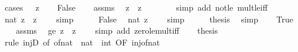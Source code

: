 \begin{isabellebody}
%
\isadelimproof
%
\endisadelimproof
%
\isatagproof
{}\isamarkupfalse%
\ {\isacharparenleft}{\kern0pt}cases\ {\isachardoublequoteopen}{}\ {\isasymle}\ z{\isacharprime}{\kern0pt}{\isachardoublequoteclose}{\isacharparenright}{\kern0pt}\isanewline
\ \ \isamarkupfalse%
\ False\isanewline
\ \ \isamarkupfalse%
\ assms\ \isamarkupfalse%
\ {\isachardoublequoteopen}z\ {\isacharasterisk}{\kern0pt}\ z{\isacharprime}{\kern0pt}\ {\isasymle}\ {}{\isachardoublequoteclose}\isanewline
\ \ \ \ \isamarkupfalse%
\ {\isacharparenleft}{\kern0pt}simp\ add{\isacharcolon}{\kern0pt}\ not{\isacharunderscore}{\kern0pt}le\ mult{\isacharunderscore}{\kern0pt}le{\isacharunderscore}{\kern0pt}{}{\isacharunderscore}{\kern0pt}iff{\isacharparenright}{\kern0pt}\isanewline
\ \ \isamarkupfalse%
\ \isamarkupfalse%
\ {\isachardoublequoteopen}nat\ {\isacharparenleft}{\kern0pt}z\ {\isacharasterisk}{\kern0pt}\ z{\isacharprime}{\kern0pt}{\isacharparenright}{\kern0pt}\ {\isacharequal}{\kern0pt}\ {}{\isachardoublequoteclose}\ \isamarkupfalse%
\ simp\isanewline
\ \ \isamarkupfalse%
\ \isamarkupfalse%
\ False\ \isamarkupfalse%
\ {\isachardoublequoteopen}nat\ z{\isacharprime}{\kern0pt}\ {\isacharequal}{\kern0pt}\ {}{\isachardoublequoteclose}\ \isamarkupfalse%
\ simp\isanewline
\ \ \isamarkupfalse%
\ \isamarkupfalse%
\ {\isacharquery}{\kern0pt}thesis\ \isamarkupfalse%
\ simp\isanewline
{}\isamarkupfalse%
\isanewline
\ \ \isamarkupfalse%
\ True\isanewline
\ \ \isamarkupfalse%
\ assms\ \isamarkupfalse%
\ ge{\isacharunderscore}{\kern0pt}{}{\isacharcolon}{\kern0pt}\ {\isachardoublequoteopen}z\ {\isacharasterisk}{\kern0pt}\ z{\isacharprime}{\kern0pt}\ {\isasymge}\ {}{\isachardoublequoteclose}\ \isamarkupfalse%
\ {\isacharparenleft}{\kern0pt}simp\ add{\isacharcolon}{\kern0pt}\ zero{\isacharunderscore}{\kern0pt}le{\isacharunderscore}{\kern0pt}mult{\isacharunderscore}{\kern0pt}iff{\isacharparenright}{\kern0pt}\isanewline
\ \ \isamarkupfalse%
\ {\isacharquery}{\kern0pt}thesis\isanewline
\ \ \ \ \isamarkupfalse%
\ {\isacharparenleft}{\kern0pt}rule\ injD\ {\isacharbrackleft}{\kern0pt}of\ {\isachardoublequoteopen}of{\isacharunderscore}{\kern0pt}nat\ {\isacharcolon}{\kern0pt}{\isacharcolon}{\kern0pt}\ nat\ {\isasymRightarrow}\ int{\isachardoublequoteclose}{\isacharcomma}{\kern0pt}\ OF\ inj{\isacharunderscore}{\kern0pt}of{\isacharunderscore}{\kern0pt}nat{\isacharbrackright}{\kern0pt}{\isacharparenright}{\kern0pt}\isanewline

\end{isabellebody}
